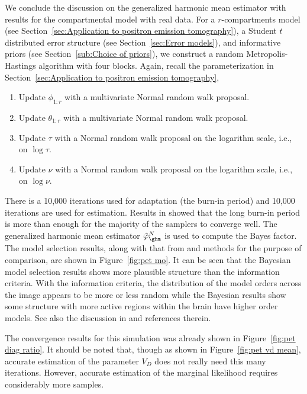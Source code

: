 We conclude the discussion on the generalized harmonic mean estimator with
results for the \pet compartmental model with real data. For a
$r$-compartments \pet model (see Section~\ref{sec:Application to positron
  emission tomography}), a Student $t$ distributed error structure (see
Section~\ref{sec:Error models}), and informative priors (see
Section~\ref{sub:Choice of priors}), we construct a random Metropolis-Hastings
algorithm with four blocks. Again, recall the parameterization in
Section~\ref{sec:Application to positron emission tomography},
\begin{enumerate}
  \item Update $\phi_{1:r}$ with a multivariate Normal random walk proposal.
  \item Update $\theta_{1:r}$ with a multivariate Normal random walk proposal.
  \item Update $\tau$ with a Normal random walk proposal on the logarithm
    scale, i.e., on $\log\tau$.
  \item Update $\nu$ with a Normal random walk proposal on the logarithm
    scale, i.e., on $\log\nu$.
\end{enumerate}
There is a 10,000 iterations used for adaptation (the burn-in period) and
10,000 iterations are used for estimation. Results in \cite{Zhou2013} showed
that the long burn-in period is more than enough for the majority of the
samplers to converge well. The generalized harmonic mean estimator
$\hat\varphi_{\ghm}^N$ is used to compute the Bayes factor. The model
selection results, along with that from \aic and \bic methods for the purpose
of comparison, are shown in Figure~\ref{fig:pet mo}. It can be seen that the
Bayesian model selection results shows more plausible structure than the
information criteria. With the information criteria, the distribution of the
model orders across the image appears to be more or less random while the
Bayesian results show some structure with more active regions within the brain
have higher order models. See also the discussion in \cite{Zhou2013} and
references therein.

\afterpage{\clearpage}

The convergence results for this simulation was already shown in
Figure~\ref{fig:pet diag ratio}. It should be noted that, though as shown in
Figure~\ref{fig:pet vd mean}, accurate estimation of the parameter $V_D$ does
not really need this many iterations. However, accurate estimation of the
marginal likelihood requires considerably more samples.

